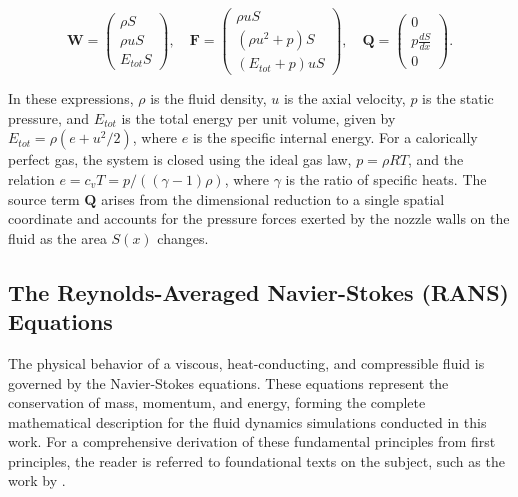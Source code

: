 \documentclass[tg, EN]{ufabcFHZh_tg}
\begin{document}
\begin{equation}
    \mathbf{W} = 
    \begin{pmatrix}
        \rho S \\
        \rho u S \\
        E_{tot}S
    \end{pmatrix},
    \quad
    \mathbf{F} = 
    \begin{pmatrix}
        \rho u S \\
        (\rho u^2 + p)S \\
        (E_{tot} + p)uS
    \end{pmatrix},
    \quad
    \mathbf{Q} = 
    \begin{pmatrix}
        0 \\
        p \frac{dS}{dx} \\
        0
    \end{pmatrix}.
\end{equation}

In these expressions, $\rho$ is the fluid density, $u$ is the axial velocity, $p$ is the static pressure, and $E_{tot}$ is the total energy per unit volume, given by $E_{tot} = \rho(e + u^2/2)$, where $e$ is the specific internal energy. For a calorically perfect gas, the system is closed using the ideal gas law, $p = \rho R T$, and the relation $e = c_v T = p/((\gamma-1)\rho)$, where $\gamma$ is the ratio of specific heats. The source term $\mathbf{Q}$ arises from the dimensional reduction to a single spatial coordinate and accounts for the pressure forces exerted by the nozzle walls on the fluid as the area $S(x)$ changes. 




\subsection{The Reynolds-Averaged Navier-Stokes (RANS) Equations}
\label{sec:rans_equations}

The physical behavior of a viscous, heat-conducting, and compressible fluid is governed by the Navier-Stokes equations. These equations represent the conservation of mass, momentum, and energy, forming the complete mathematical description for the fluid dynamics simulations conducted in this work. For a comprehensive derivation of these fundamental principles from first principles, the reader is referred to foundational texts on the subject, such as the work by \cite{versteeg2007}.
\end{document}
